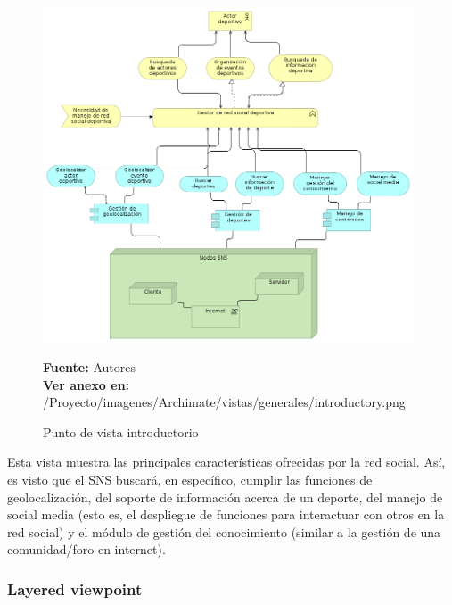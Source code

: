 \begin{figure}[!htb]
  \begin{center}
    \includegraphics[width=11cm]{./imagenes/Archimate/vistas/generales/introductory.png}
    \caption{Punto de vista introductorio}
    \label{fig:introductory}
    \textbf{Fuente:}  Autores \\
    \textbf{Ver anexo en:} /Proyecto/imagenes/Archimate/vistas/generales/introductory.png
  \end{center}
\end{figure}

Esta vista muestra las principales características ofrecidas por la red social. Así, es visto que el SNS buscará, en específico, cumplir las funciones de geolocalización, del soporte de información acerca de un deporte, del manejo de social media (esto es, el despliegue de funciones para interactuar con otros en la red social) y el módulo de gestión del conocimiento (similar a la gestión de una comunidad/foro en internet).

\subsubsection{Layered viewpoint}

